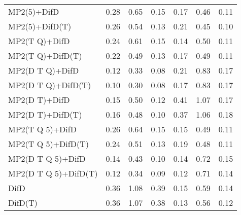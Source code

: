 \begin{table}
\begin{tabular}{l l l l l l l }
    MP2(5)+DifD & 0.28 & 0.65 & 0.15 & 0.17 & 0.46 & 0.11 \\ 
    MP2(5)+DifD(T) & 0.26 & 0.54 & 0.13 & 0.21 & 0.45 & 0.10 \\ 
    MP2(T Q)+DifD & 0.24 & 0.61 & 0.15 & 0.14 & 0.50 & 0.11 \\ 
    MP2(T Q)+DifD(T) & 0.22 & 0.49 & 0.13 & 0.17 & 0.49 & 0.11 \\ 
    MP2(D T Q)+DifD & 0.12 & 0.33 & 0.08 & 0.21 & 0.83 & 0.17 \\ 
    MP2(D T Q)+DifD(T) & 0.10 & 0.30 & 0.08 & 0.17 & 0.83 & 0.17 \\ 
    MP2(D T)+DifD & 0.15 & 0.50 & 0.12 & 0.41 & 1.07 & 0.17 \\ 
    MP2(D T)+DifD(T) & 0.16 & 0.48 & 0.10 & 0.37 & 1.06 & 0.18 \\ 
    MP2(T Q 5)+DifD & 0.26 & 0.64 & 0.15 & 0.15 & 0.49 & 0.11 \\ 
    MP2(T Q 5)+DifD(T) & 0.24 & 0.51 & 0.13 & 0.19 & 0.48 & 0.11 \\ 
    MP2(D T Q 5)+DifD & 0.14 & 0.43 & 0.10 & 0.14 & 0.72 & 0.15 \\ 
    MP2(D T Q 5)+DifD(T) & 0.12 & 0.34 & 0.09 & 0.12 & 0.71 & 0.14 \\ 
    DifD & 0.36 & 1.08 & 0.39 & 0.15 & 0.59 & 0.14 \\ 
    DifD(T) & 0.36 & 1.07 & 0.38 & 0.13 & 0.56 & 0.12 \\ 
    \hline
  \end{tabular}
\end{table}
